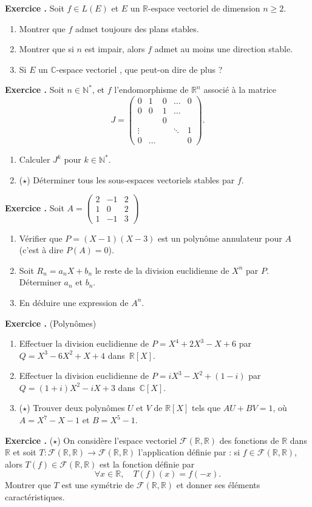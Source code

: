 \documentclass[10pt,a4paper]{article}
\def\bf#1{\textbf{#1}}
\newcounter{nexo}
\newcommand{\exo}{\medskip\noindent \bf{ Exercice \thenexo. \stepcounter{nexo}}}
\def\be{\begin{enumerate}}
\def\ee{\end{enumerate}}
\def\ev{espace vectoriel }
\def\N{\mathbb{N}}
\def\R{\mathbb{R}}
\def\C{\mathbb{C}}
\def\mat#1{\begin{pmatrix}#1\end{pmatrix}}
\begin{document}
\exo Soit $f\in L(E)$ et $E$ un $\R$-\ev de dimension $n\geq 2$. 
\be
\item Montrer que $f$ admet toujours des plans stables. 
\item Montrer que si $n$ est impair, alors $f$ admet au moins une direction stable. 
\item Si $E$ un $\C$-\ev, que peut-on dire de plus ?
\ee

\exo Soit $n \in \N^*$, et $f$ l'endomorphisme de $\R^n$ associé à la matrice
%
\begin{equation*}
 J = \mat{0 & 1 & 0 & \ldots & 0\\ 
0 & 0 & 1 & \ldots & \\
   &     & 0 & \\
 \vdots   &     &  &\ddots & 1 \\  
 0 &\ldots & & & 0 }.
\end{equation*}

\be
\item Calculer $J^k$ pour $k \in \N^*$.
\item ($\star$) Déterminer tous les sous-espaces vectoriels stables par $f$.
\ee

\exo Soit $A= \mat{2&-1&2\\1&0&2\\1&-1&3}$
\be 
\item Vérifier que $P = (X-1)(X-3)$ est un polynôme annulateur pour $A$ (c'est à dire $P(A)=0$).
\item Soit $R_n = a_n X + b_n$ le reste de la division euclidienne de $X^n$ par $P$. Déterminer $a_n$ et $b_n$.
\item En déduire une expression de $A^n$.
\ee

\exo (Polynômes)
\be
\item Effectuer la division euclidienne de $P=X^4+2X^3-X+6$ par $Q=X^3-6X^2+X+4$ dans~$\R[X]$.
\item Effectuer la division euclidienne de $P=iX^3-X^2+(1-i)$ par $Q=(1+i)X^2-iX+3$ dans~$\C[X]$.
\item ($\star$) Trouver deux polynômes $U$ et $V$ de $\R[X]$ tels que $AU+BV=1$, où $A=X^7-X-1$ et $B=X^5-1$.
\ee


\exo ($\star$)
On considère l’espace vectoriel $\mathcal{F}(\R,\R)$ des fonctions de $\R$ dans $\R$ et soit $T: \mathcal{F}(\R,\R) \rightarrow \mathcal{F}(\R,\R)$ l'application 
définie par : si $f \in \mathcal{F}(\R,\R)$, alors $T(f) \in \mathcal{F}(\R,\R)$ est la fonction définie par  
%
\begin{equation*}
 \forall x \in \R, \quad T(f)(x) = f(-x).
\end{equation*}
%
Montrer que $T$ est une symétrie de $\mathcal{F}(\R,\R)$ et donner ses éléments caractéristiques.
\end{document}
